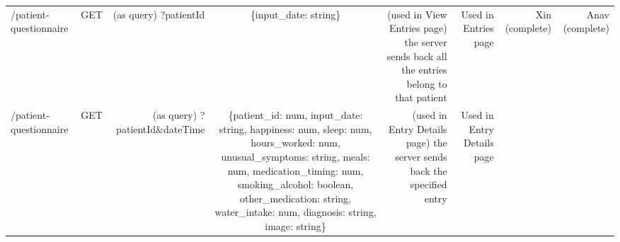 \documentclass[]{book}
\begin{document}
\begin{longtable}[]{@{}lrrcrrrr@{}}
\begin{minipage}[t]{0.13\columnwidth}
/patient-questionnaire\strut
\end{minipage} & \begin{minipage}[t]{0.14\columnwidth}\raggedleft
GET\strut
\end{minipage} & \begin{minipage}[t]{0.14\columnwidth}\raggedleft
(as query) ?patientId\strut
\end{minipage} & \begin{minipage}[t]{0.15\columnwidth}\centering
\{input\_date: string\}\strut
\end{minipage} & \begin{minipage}[t]{0.06\columnwidth}\raggedleft
(used in View Entries page) the server sends back all the entries belong to that patient\strut
\end{minipage} & \begin{minipage}[t]{0.06\columnwidth}\raggedleft
Used in Entries page\strut
\end{minipage} & \begin{minipage}[t]{0.06\columnwidth}\raggedleft
Xin (complete)\strut
\end{minipage} & \begin{minipage}[t]{0.06\columnwidth}\raggedleft
Anav (complete)\strut
\end{minipage}\tabularnewline
\begin{minipage}[t]{0.13\columnwidth}\raggedright
/patient-questionnaire\strut
\end{minipage} & \begin{minipage}[t]{0.14\columnwidth}\raggedleft
GET\strut
\end{minipage} & \begin{minipage}[t]{0.14\columnwidth}\raggedleft
(as query) ?patientId\&dateTime\strut
\end{minipage} & \begin{minipage}[t]{0.15\columnwidth}\centering
\{patient\_id: num, input\_date: string, happiness: num, sleep: num, hours\_worked: num, unusual\_symptoms: string, meals: num, medication\_timing: num, smoking\_alcohol: boolean, other\_medication: string, water\_intake: num, diagnosis: string, image: string\}\strut
\end{minipage} & \begin{minipage}[t]{0.06\columnwidth}\raggedleft
(used in Entry Details page) the server sends back the specified entry\strut
\end{minipage} & \begin{minipage}[t]{0.06\columnwidth}\raggedleft
Used in Entry Details page\strut

\end{minipage}
\end{longtable}
\end{document}
